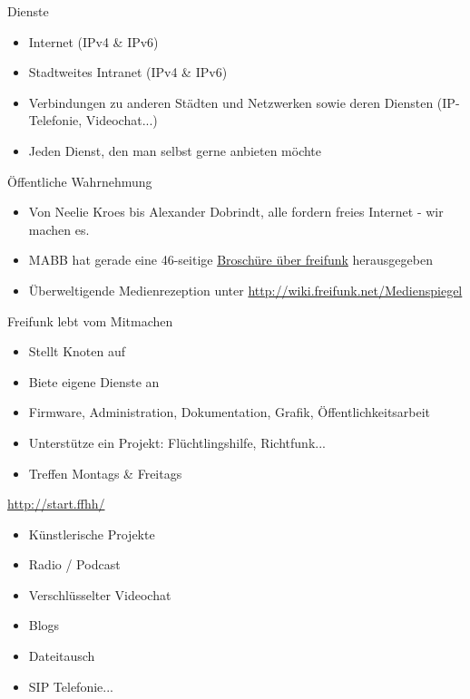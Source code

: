 \documentclass[t]{beamer}
\begin{document}
\begin{frame}{Dienste}
	\begin{itemize}
		\item Internet (IPv4 \& IPv6)
		\item Stadtweites Intranet (IPv4 \& IPv6)
		\item Verbindungen zu anderen Städten und Netzwerken sowie deren Diensten (IP-Telefonie, Videochat...)
		\item Jeden Dienst, den man selbst gerne anbieten möchte
	\end{itemize}
\end{frame}

\begin{frame}{Öffentliche Wahrnehmung}
	\begin{itemize}
		\item Von Neelie Kroes bis Alexander Dobrindt, alle fordern freies Internet - wir machen es.
		\item MABB hat gerade eine 46-seitige \href{http://mabb.de/presse/pressemitteilungen/details/wlan-fuer-alle-freie-funknetze-in-der-praxis.html}{Broschüre über freifunk} herausgegeben 
		\item Überweltigende Medienrezeption unter \href{http://wiki.freifunk.net/Medienspiegel}{http://wiki.freifunk.net/Medienspiegel}
	\end{itemize}
\end{frame}


\begin{frame}{Freifunk lebt vom Mitmachen}
	\begin{itemize}
		\item Stellt Knoten auf
		\item Biete eigene Dienste an
		\item Firmware, Administration, Dokumentation, Grafik, Öffentlichkeitsarbeit
		\item Unterstütze ein Projekt: Flüchtlingshilfe, Richtfunk...
		\item Treffen Montags \& Freitags
	\end{itemize}
\end{frame}

\begin{frame}{\href{http://start.ffhh/}{http://start.ffhh/}}
	\begin{itemize}
		\item Künstlerische Projekte
		\item Radio / Podcast
		\item Verschlüsselter Videochat
		\item Blogs
		\item Dateitausch
		\item SIP Telefonie...
	\end{itemize}
\end{frame}
\end{document}
